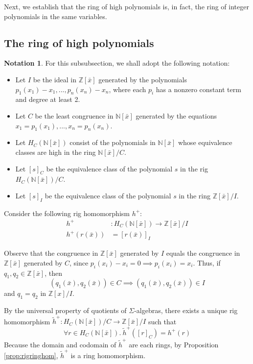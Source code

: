 \documentclass{msthesis}
\theoremstyle{definition}
\newtheorem*{notation}{Notation}
\newcommand{\ints}{\mathbb{Z}}
\newcommand{\nat}{\mathbb{N}}
\begin{document}
Next, we establish that the ring of high polynomials is, in fact, the ring of integer polynomials in the same variables.

\subsection{The ring of high polynomials}

\begin{notation}
For this subsubsection, we shall adopt the following notation:
\begin{itemize}[nosep]
\item Let $I$ be the ideal in $\ints[\bar{x}]$ generated by the polynomials $p_1(x_1)-x_1,..., p_n(x_n)-x_n$, where each $p_i$ has a nonzero constant term and degree at least 2.

\item Let $C$ be the least congruence in $\nat[\bar{x}]$ generated by the equations $x_1=p_1(x_1), ..., x_n=p_n(x_n)$.  

\item Let $H_C(\nat[\bar{x}])$ consist of the polynomials in $\nat[\bar{x}]$ whose equivalence classes are high in the ring $\nat[\bar{x}]/C$.  

\item Let $[s]_C$ be the equivalence class of the polynomial $s$ in the rig $H_C(\nat[\bar{x}])/C$.  

\item Let $[s]_I$ be the equivalence class of the polynomial $s$ in the ring $\ints[\bar{x}]/I$.
\end{itemize}
\end{notation}

Consider the following rig homomorphism $h^+$:
\begin{align*}
    h^+ &: H_C(\nat[\bar{x}]) \to \ints[\bar{x}]/I \\
    h^+(r(\bar{x})) &=  [r(\bar{x})]_I
\end{align*}

Observe that the congruence in $\ints[\bar{x}]$ generated by $I$ equals the congruence in $\ints[\bar{x}]$ generated by $C$, since $p_i(x_i) - x_i = 0 \implies p_i(x_i) = x_i$. Thus, if $q_1, q_2 \in \ints[\bar{x}]$, then
\[ (q_1(\bar{x}), q_2(\bar{x})) \in C \implies (q_1(\bar{x}), q_2(\bar{x})) \in I \]
and $q_1 = q_2$ in $\ints[x]/I$.

By the universal property of quotients of $\Sigma$-algebras, there exists a unique rig homomorphism $\tilde{h}^+ : H_C(\nat[\bar{x}])/C \to \ints[\bar{x}]/I$ such that 
\[\forall r \in H_C(\nat[\bar{x}]).\ \tilde{h}^+([r]_C) = h^+(r)\]
Because the domain and codomain of $\tilde{h}^+$ are each rings, by Proposition \ref{prop:rigringhom}, $\tilde{h}^+$ is a ring homomorphism.
\end{document}
